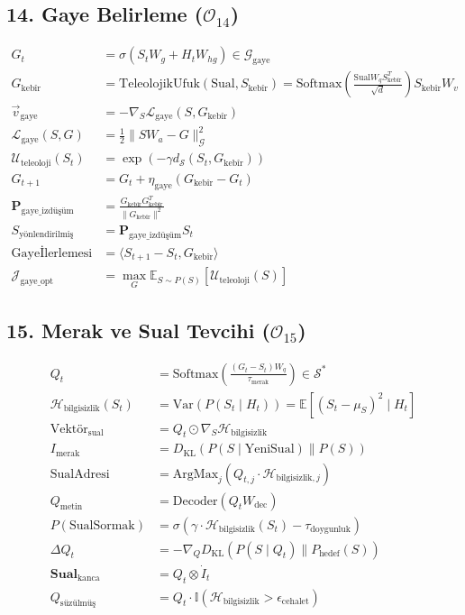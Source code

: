 \documentclass[11pt, a4paper]{article}
\begin{document}
\subsection{14. Gaye Belirleme ($\mathcal{O}_{14}$)}
\begin{align}
G_t &= \sigma(S_t W_g + H_t W_{hg}) \in \mathcal{G}_{\text{gaye}} \\
G_{\text{kebîr}} &= \text{TeleolojikUfuk}(\text{Sual}, S_{\text{kebîr}}) = \text{Softmax}\left( \frac{\text{Sual} W_q S_{\text{kebîr}}^T}{\sqrt{d}} \right) S_{\text{kebîr}} W_v \\
\vec{v}_{\text{gaye}} &= -\nabla_{S} \mathcal{L}_{\text{gaye}}(S, G_{\text{kebîr}}) \\
\mathcal{L}_{\text{gaye}}(S, G) &= \frac{1}{2} \|S W_a - G\|_{\mathcal{G}}^2 \\
\mathcal{U}_{\text{teleoloji}}(S_t) &= \exp\left( -\gamma d_{\mathcal{S}}(S_t, G_{\text{kebîr}}) \right) \\
G_{t+1} &= G_t + \eta_{\text{gaye}} (G_{\text{kebîr}} - G_t) \\
\mathbf{P}_{\text{gaye\_izdüşüm}} &= \frac{G_{\text{kebîr}} G_{\text{kebîr}}^T}{\|G_{\text{kebîr}}\|^2} \\
S_{\text{yönlendirilmiş}} &= \mathbf{P}_{\text{gaye\_izdüşüm}} S_t \\
\text{Gayeİlerlemesi} &= \langle S_{t+1} - S_t, G_{\text{kebîr}} \rangle \\
\mathcal{J}_{\text{gaye\_opt}} &= \max_{G} \mathbb{E}_{S \sim P(S)} [\mathcal{U}_{\text{teleoloji}}(S)]
\end{align}

\subsection{15. Merak ve Sual Tevcihi ($\mathcal{O}_{15}$)}
\begin{align}
Q_t &= \text{Softmax}\left( \frac{(G_t - S_t) W_q}{\tau_{\text{merak}}} \right) \in \mathcal{S}^* \\
\mathcal{H}_{\text{bilgisizlik}}(S_t) &= \text{Var}(P(S_t \mid H_t)) = \mathbb{E}[(S_t - \mu_S)^2 \mid H_t] \\
\text{Vektör}_{\text{sual}} &= Q_t \odot \nabla_{S} \mathcal{H}_{\text{bilgisizlik}} \\
I_{\text{merak}} &= D_{\text{KL}}\left( P(S \mid \text{YeniSual}) \parallel P(S) \right) \\
\text{SualAdresi} &= \text{ArgMax}_{j} (Q_{t, j} \cdot \mathcal{H}_{\text{bilgisizlik}, j}) \\
Q_{\text{metin}} &= \text{Decoder}(Q_t W_{\text{dec}}) \\
P(\text{SualSormak}) &= \sigma(\gamma \cdot \mathcal{H}_{\text{bilgisizlik}}(S_t) - \tau_{\text{doygunluk}}) \\
\Delta Q_t &= -\nabla_Q D_{\text{KL}}(P(S \mid Q_t) \parallel P_{\text{hedef}}(S)) \\
\mathbf{Sual}_{\text{kanca}} &= Q_t \otimes \dot{I}_t \\
Q_{\text{süzülmüş}} &= Q_t \cdot \mathbb{I}(\mathcal{H}_{\text{bilgisizlik}} > \epsilon_{\text{cehalet}})
\end{align}
\end{document}
